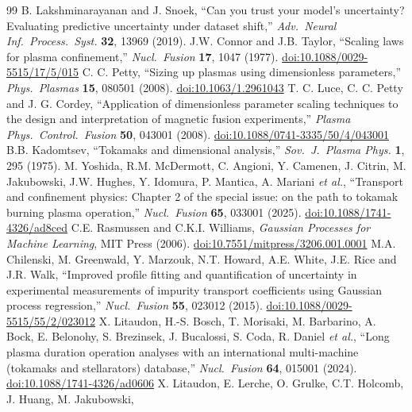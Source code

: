 \documentclass[aip,pop,preprint,amsmath,amssymb]{revtex4-2}
\begin{document}
\begin{thebibliography}{99}
B. Lakshminarayanan and J. Snoek, ``Can you trust your model's
uncertainty? Evaluating predictive uncertainty under dataset shift,''
\emph{Adv.\ Neural Inf.\ Process.\ Syst.} \textbf{32}, 13969 (2019).
 J.W. Connor and J.B. Taylor, ``Scaling laws for plasma
confinement,'' \emph{Nucl.\ Fusion} \textbf{17}, 1047 (1977).
\href{https://doi.org/10.1088/0029-5515/17/5/015}{doi:10.1088/0029-5515/17/5/015}
 C. C. Petty, ``Sizing up plasmas using dimensionless
parameters,'' \emph{Phys.\ Plasmas} \textbf{15}, 080501 (2008).
\href{https://doi.org/10.1063/1.2961043}{doi:10.1063/1.2961043}
 T. C. Luce, C. C. Petty and J. G. Cordey, ``Application of
dimensionless parameter scaling techniques to the design and interpretation of
magnetic fusion experiments,'' \emph{Plasma Phys.\ Control.\ Fusion} \textbf{50},
043001 (2008).
\href{https://doi.org/10.1088/0741-3335/50/4/043001}{doi:10.1088/0741-3335/50/4/043001}
 B.B. Kadomtsev, ``Tokamaks and dimensional analysis,''
\emph{Sov.\ J.\ Plasma Phys.} \textbf{1}, 295 (1975).
 M. Yoshida, R.M. McDermott, C. Angioni, Y. Camenen, J. Citrin,
M. Jakubowski, J.W. Hughes, Y. Idomura, P. Mantica, A. Mariani \emph{et al.},
``Transport and confinement physics: Chapter 2 of the special issue: on the
path to tokamak burning plasma operation,'' \emph{Nucl.\ Fusion} \textbf{65},
033001 (2025).
\href{https://doi.org/10.1088/1741-4326/ad8ced}{doi:10.1088/1741-4326/ad8ced}
 C.E. Rasmussen and C.K.I. Williams, \emph{Gaussian Processes for
Machine Learning}, MIT Press (2006).
\href{https://doi.org/10.7551/mitpress/3206.001.0001}{doi:10.7551/mitpress/3206.001.0001}
 M.A. Chilenski, M. Greenwald, Y. Marzouk, N.T. Howard,
A.E. White, J.E. Rice and J.R. Walk, ``Improved profile fitting and
quantification of uncertainty in experimental measurements of impurity transport
coefficients using Gaussian process regression,'' \emph{Nucl.\ Fusion}
\textbf{55}, 023012 (2015).
\href{https://doi.org/10.1088/0029-5515/55/2/023012}{doi:10.1088/0029-5515/55/2/023012}
 X. Litaudon, H.-S. Bosch, T. Morisaki, M. Barbarino, A. Bock, E. Belonohy,
S. Brezinsek, J. Bucalossi, S. Coda, R. Daniel \emph{et al.},
``Long plasma duration operation
analyses with an international multi-machine (tokamaks and stellarators)
database,'' \emph{Nucl.\ Fusion} \textbf{64}, 015001 (2024).
\href{https://doi.org/10.1088/1741-4326/ad0606}{doi:10.1088/1741-4326/ad0606}
 X. Litaudon, E. Lerche, O. Grulke, C.T. Holcomb, J. Huang, M. Jakubowski,

\end{thebibliography}
\end{document}
